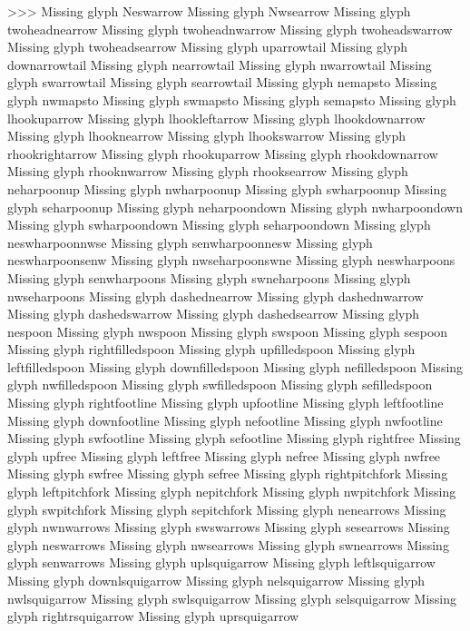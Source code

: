 >>>
Missing glyph	Neswarrow
Missing glyph	Nwsearrow
Missing glyph	twoheadnearrow
Missing glyph	twoheadnwarrow
Missing glyph	twoheadswarrow
Missing glyph	twoheadsearrow
Missing glyph	uparrowtail
Missing glyph	downarrowtail
Missing glyph	nearrowtail
Missing glyph	nwarrowtail
Missing glyph	swarrowtail
Missing glyph	searrowtail
Missing glyph	nemapsto
Missing glyph	nwmapsto
Missing glyph	swmapsto
Missing glyph	semapsto
Missing glyph	lhookuparrow
Missing glyph	lhookleftarrow
Missing glyph	lhookdownarrow
Missing glyph	lhooknearrow
Missing glyph	lhookswarrow
Missing glyph	rhookrightarrow
Missing glyph	rhookuparrow
Missing glyph	rhookdownarrow
Missing glyph	rhooknwarrow
Missing glyph	rhooksearrow
Missing glyph	neharpoonup
Missing glyph	nwharpoonup
Missing glyph	swharpoonup
Missing glyph	seharpoonup
Missing glyph	neharpoondown
Missing glyph	nwharpoondown
Missing glyph	swharpoondown
Missing glyph	seharpoondown
Missing glyph	neswharpoonnwse
Missing glyph	senwharpoonnesw
Missing glyph	neswharpoonsenw
Missing glyph	nwseharpoonswne
Missing glyph	neswharpoons
Missing glyph	senwharpoons
Missing glyph	swneharpoons
Missing glyph	nwseharpoons
Missing glyph	dashednearrow
Missing glyph	dashednwarrow
Missing glyph	dashedswarrow
Missing glyph	dashedsearrow
Missing glyph	nespoon
Missing glyph	nwspoon
Missing glyph	swspoon
Missing glyph	sespoon
Missing glyph	rightfilledspoon
Missing glyph	upfilledspoon
Missing glyph	leftfilledspoon
Missing glyph	downfilledspoon
Missing glyph	nefilledspoon
Missing glyph	nwfilledspoon
Missing glyph	swfilledspoon
Missing glyph	sefilledspoon
Missing glyph	rightfootline
Missing glyph	upfootline
Missing glyph	leftfootline
Missing glyph	downfootline
Missing glyph	nefootline
Missing glyph	nwfootline
Missing glyph	swfootline
Missing glyph	sefootline
Missing glyph	rightfree
Missing glyph	upfree
Missing glyph	leftfree
Missing glyph	nefree
Missing glyph	nwfree
Missing glyph	swfree
Missing glyph	sefree
Missing glyph	rightpitchfork
Missing glyph	leftpitchfork
Missing glyph	nepitchfork
Missing glyph	nwpitchfork
Missing glyph	swpitchfork
Missing glyph	sepitchfork
Missing glyph	nenearrows
Missing glyph	nwnwarrows
Missing glyph	swswarrows
Missing glyph	sesearrows
Missing glyph	neswarrows
Missing glyph	nwsearrows
Missing glyph	swnearrows
Missing glyph	senwarrows
Missing glyph	uplsquigarrow
Missing glyph	leftlsquigarrow
Missing glyph	downlsquigarrow
Missing glyph	nelsquigarrow
Missing glyph	nwlsquigarrow
Missing glyph	swlsquigarrow
Missing glyph	selsquigarrow
Missing glyph	rightrsquigarrow
Missing glyph	uprsquigarrow
